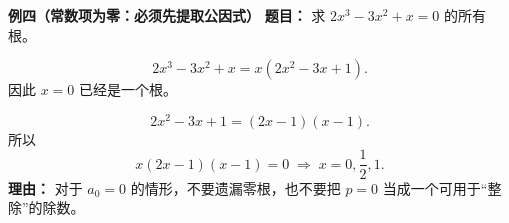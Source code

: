 \begin{examplebox}
    \medskip
    \textbf{\textcolor{CExample}{例四（常数项为零：必须先提取公因式）}}
    \textbf{\textcolor{CExample}{题目：}}
    求 $2x^3-3x^2+x=0$ 的所有根。
    \begin{description}[style=nextline, leftmargin=2.8em, labelsep=0.5em, itemsep=0.45em]
        \item[\textbf{第一步（先取出 $x$）：}]
            \[
               2x^3-3x^2+x=x(2x^2-3x+1).
            \]
            因此 $x=0$ 已经是一个根。
        \item[\textbf{第二步（分解剩余部分）：}]
            \[
               2x^2-3x+1=(2x-1)(x-1).
            \]
            所以
            \[
               \boxed{x(2x-1)(x-1)=0\;\Longrightarrow\;x=0,\frac12,1.}
            \]
            \textbf{理由：} 对于 $a_0=0$ 的情形，不要遗漏零根，也不要把 $p=0$ 当成一个可用于“整除”的除数。
    \end{description}
\end{examplebox}
